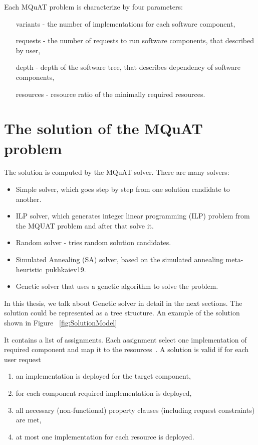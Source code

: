 Each MQuAT problem is characterize by four parameters:

\begin{itemize}
	\item[variants] - the number of implementations for each software component,
	\item[requests] - the number of requests to run software components, that described by user, 
	\item[depth] - depth of the software tree, that describes dependency of software components,
	\item[resources] - resource ratio of the minimally required resources.
\end{itemize}

\section{The solution of the MQuAT problem}

The solution is computed by the MQuAT solver. There are many solvers:

\begin{itemize}
	\item Simple solver, which goes step by step from one solution candidate to another.
	\item ILP solver, which generates integer linear programming (ILP) problem from the MQUAT problem and after that solve it.
	\item Random solver - tries random solution candidates.
	\item Simulated Annealing (SA) solver, based on the simulated annealing meta-heuristic~{pukhkaiev19}.
	\item Genetic solver that uses a genetic algorithm to solve the problem.
\end{itemize}

In this thesis, we talk about Genetic solver in detail in the next sections.
The solution could be represented as a tree structure. An example of the solution shown in Figure ~\ref{fig:SolutionModel}

It contains a list of assignments. Each assignment select one implementation of required component and map it to the resources~\cite{gotz18}.
A solution is valid if for each user request

\begin{enumerate}
	\item an implementation is deployed for the target component,
	\item for each component required implementation is deployed,
	\item all necessary (non-functional) property clauses (including request constraints) are met,
	\item at most one implementation for each resource is deployed.
\end{enumerate}

